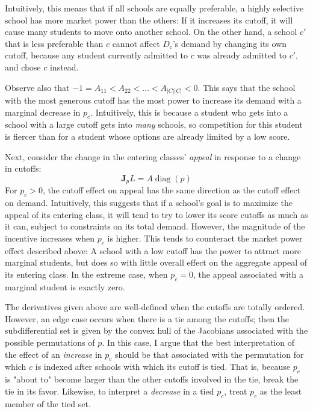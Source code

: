 \documentclass[12pt]{article}
\theoremstyle{definition}
\begin{document}
Intuitively, this means that if all schools are equally preferable, a highly selective school has more market power than the others: If it increases its cutoff, it will cause many students to move onto another school. On the other hand, a school $c'$ that is less preferable than $c$ cannot affect $D_c$'s demand by changing its own cutoff, because any student currently admitted to $c$ was already admitted to $c'$, and chose $c$ instead. 

Observe also that $-1 = A_{11} < A_{22} < \dots < A_{|C||C|} < 0$. This says that the school with the most generous cutoff has the most power to increase its demand with a marginal decrease in $p_c$. Intuitively, this is because a student who gets into a school with a large cutoff gets into \emph{many} schools, so competition for this student is fiercer than for a student whose options are already limited by a low score.

Next, consider the change in the entering classes' \emph{appeal} in response to a change in cutoffs:
\[\mathbf{J}_p L = A\operatorname{diag}(p)\]
For $p_c > 0$, the cutoff effect on appeal has the same direction as the cutoff effect on demand. Intuitively, this suggests that if a school's goal is to maximize the appeal of its entering class, it will tend to try to lower its score cutoffs as much as it can, subject to constraints on its total demand. However, the magnitude of the incentive increases when $p_c$ is higher. This tends to counteract the market power effect described above: A school with a low cutoff has the power to attract more marginal students, but does so with little overall effect on the aggregate appeal of its entering class. In the extreme case, when $p_c = 0$, the appeal associated with a marginal student is exactly zero.

The derivatives given above are well-defined when the cutoffs are totally ordered. However, an edge case occurs when there is a tie among the cutoffs; then the subdifferential set is given by the convex hull of the Jacobians associated with the possible permutations of $p$. In this case, I argue that the best interpretation of the effect of an \emph{increase} in $p_c$ should be that associated with the permutation for which $c$ is indexed after schools with which its cutoff is tied. That is, because $p_c$ is "about to" become larger than the other cutoffs involved in the tie, break the tie in its favor. Likewise, to interpret a \emph{decrease} in a tied $p_c$, treat $p_c$ as the least member of the tied set.
\end{document}
